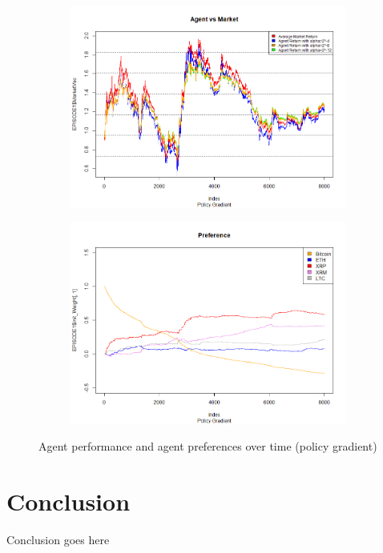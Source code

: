 \documentclass[a4paper,12pt]{article}
\begin{document}
\begin{figure}[h!]
  \centering
  \begin{subfigure}[b]{0.4\linewidth}
    \includegraphics[width=\linewidth]{figures/agt_vs_mkt_pg.png}
  \end{subfigure}
  \begin{subfigure}[b]{0.4\linewidth}
    \includegraphics[width=\linewidth]{figures/prefs_pg.png}
  \end{subfigure}
  \caption{Agent performance and agent preferences over time (policy gradient)}
  \label{fig:pg}
\end{figure}

\section{Conclusion}
Conclusion goes here
\end{document}
